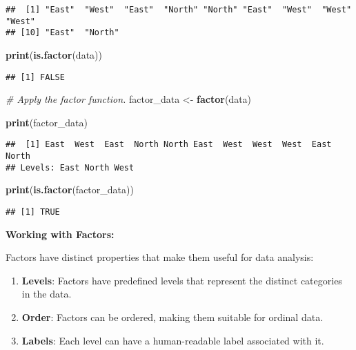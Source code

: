 \documentclass[
]{article}
\newenvironment{Shaded}{\begin{snugshade}}{\end{snugshade}}
\newcommand{\CommentTok}[1]{\textcolor[rgb]{0.56,0.35,0.01}{\textit{#1}}}
\newcommand{\FunctionTok}[1]{\textcolor[rgb]{0.13,0.29,0.53}{\textbf{#1}}}
\newcommand{\NormalTok}[1]{#1}
\newcommand{\OtherTok}[1]{\textcolor[rgb]{0.56,0.35,0.01}{#1}}
\providecommand{\tightlist}{%
  \setlength{\itemsep}{0pt}\setlength{\parskip}{0pt}}
\begin{document}
\begin{verbatim}
##  [1] "East"  "West"  "East"  "North" "North" "East"  "West"  "West"  "West" 
## [10] "East"  "North"
\end{verbatim}

\begin{Shaded}
\begin{Highlighting}[]
\FunctionTok{print}\NormalTok{(}\FunctionTok{is.factor}\NormalTok{(data))}
\end{Highlighting}
\end{Shaded}

\begin{verbatim}
## [1] FALSE
\end{verbatim}

\begin{Shaded}
\begin{Highlighting}[]
\CommentTok{\# Apply the factor function.}
\NormalTok{factor\_data }\OtherTok{\textless{}{-}} \FunctionTok{factor}\NormalTok{(data)}

\FunctionTok{print}\NormalTok{(factor\_data)}
\end{Highlighting}
\end{Shaded}

\begin{verbatim}
##  [1] East  West  East  North North East  West  West  West  East  North
## Levels: East North West
\end{verbatim}

\begin{Shaded}
\begin{Highlighting}[]
\FunctionTok{print}\NormalTok{(}\FunctionTok{is.factor}\NormalTok{(factor\_data))}
\end{Highlighting}
\end{Shaded}

\begin{verbatim}
## [1] TRUE
\end{verbatim}

\textbf{Working with Factors:}

Factors have distinct properties that make them useful for data
analysis:

\begin{enumerate}
\def\labelenumi{\arabic{enumi}.}
\tightlist
\item
  \textbf{Levels}: Factors have predefined levels that represent the
  distinct categories in the data.
\item
  \textbf{Order}: Factors can be ordered, making them suitable for
  ordinal data.
\item
  \textbf{Labels}: Each level can have a human-readable label associated
  with it.
\end{enumerate}
\end{document}
